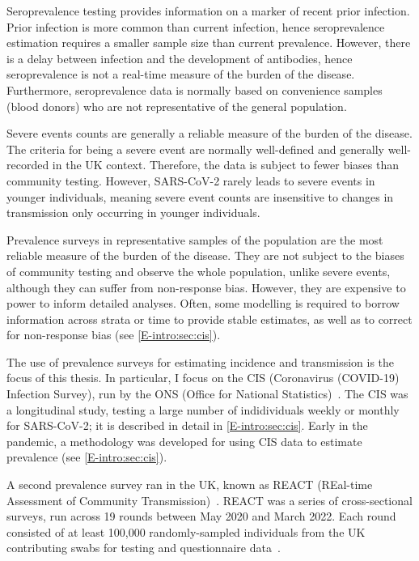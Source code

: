 \documentclass[thesis.tex]{subfiles}
\begin{document}
Seroprevalence testing provides information on a marker of recent prior infection.
Prior infection is more common than current infection, hence seroprevalence estimation requires a smaller sample size than current prevalence.
However, there is a delay between infection and the development of antibodies, hence seroprevalence is not a real-time measure of the burden of the disease.
Furthermore, seroprevalence data is normally based on convenience samples (\eg blood donors) who are not representative of the general population.

Severe events counts are generally a reliable measure of the burden of the disease.
The criteria for being a severe event are normally well-defined and generally well-recorded in the UK context.
Therefore, the data is subject to fewer biases than community testing.
However, SARS-CoV-2 rarely leads to severe events in younger individuals, meaning severe event counts are insensitive to changes in transmission only occurring in younger individuals.

Prevalence surveys in representative samples of the population are the most reliable measure of the burden of the disease.
They are not subject to the biases of community testing and observe the whole population, unlike severe events, although they can suffer from non-response bias.
However, they are expensive to power to inform detailed analyses.
Often, some modelling is required to borrow information across strata or time to provide stable estimates, as well as to correct for non-response bias (see \cref{E-intro:sec:cis}).

The use of prevalence surveys for estimating incidence and transmission is the focus of this thesis.
In particular, I focus on the CIS (Coronavirus (COVID-19) Infection Survey), run by the ONS (Office for National Statistics)~\autocite{CIS,cisMethodsONS}.
The CIS was a longitudinal study, testing a large number of indidividuals weekly or monthly for SARS-CoV-2; it is described in detail in \cref{E-intro:sec:cis}.
Early in the pandemic, a methodology was developed for using CIS data to estimate prevalence (see \cref{E-intro:sec:cis}).

A second prevalence survey ran in the UK, known as REACT (REal-time Assessment of Community Transmission)~\autocite{rileyResurgence,rileyREACT}.
REACT was a series of cross-sectional surveys, run across 19 rounds between May 2020 and March 2022.
Each round consisted of at least 100,000 randomly-sampled individuals from the UK contributing swabs for testing and questionnaire data~\autocite{elliottTwin}.
\end{document}
